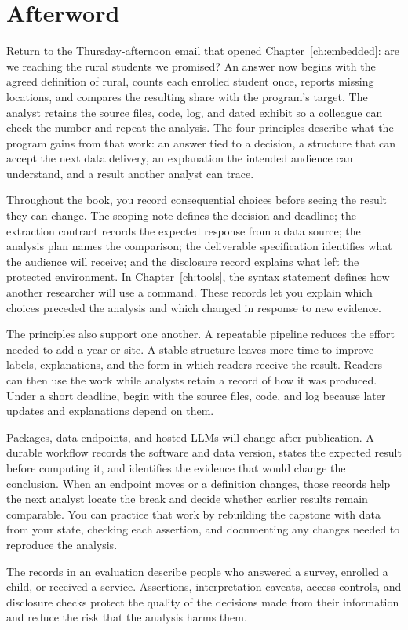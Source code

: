 \documentclass[
    a4paper,
    fontsize=10pt,
    twoside=true,
    numbers=noenddot,
]{kaobook}
\begin{document}

\chapter*{Afterword}
Return to the Thursday-afternoon email that opened Chapter~\ref{ch:embedded}: are we reaching the rural students we promised? An answer now begins with the agreed definition of rural, counts each enrolled student once, reports missing locations, and compares the resulting share with the program's target. The analyst retains the source files, code, log, and dated exhibit so a colleague can check the number and repeat the analysis. The four principles describe what the program gains from that work: an answer tied to a decision, a structure that can accept the next data delivery, an explanation the intended audience can understand, and a result another analyst can trace.

Throughout the book, you record consequential choices before seeing the result they can change. The scoping note defines the decision and deadline; the extraction contract records the expected response from a data source; the analysis plan names the comparison; the deliverable specification identifies what the audience will receive; and the disclosure record explains what left the protected environment. In Chapter~\ref{ch:tools}, the syntax statement defines how another researcher will use a command. These records let you explain which choices preceded the analysis and which changed in response to new evidence.

The principles also support one another. A repeatable pipeline reduces the effort needed to add a year or site. A stable structure leaves more time to improve labels, explanations, and the form in which readers receive the result. Readers can then use the work while analysts retain a record of how it was produced. Under a short deadline, begin with the source files, code, and log because later updates and explanations depend on them.

Packages, data endpoints, and hosted LLMs will change after publication. A durable workflow records the software and data version, states the expected result before computing it, and identifies the evidence that would change the conclusion. When an endpoint moves or a definition changes, those records help the next analyst locate the break and decide whether earlier results remain comparable. You can practice that work by rebuilding the capstone with data from your state, checking each assertion, and documenting any changes needed to reproduce the analysis.

The records in an evaluation describe people who answered a survey, enrolled a child, or received a service. Assertions, interpretation caveats, access controls, and disclosure checks protect the quality of the decisions made from their information and reduce the risk that the analysis harms them.

\printbibliography[heading=bibintoc, title=Bibliography]

\printindex
\end{document}
